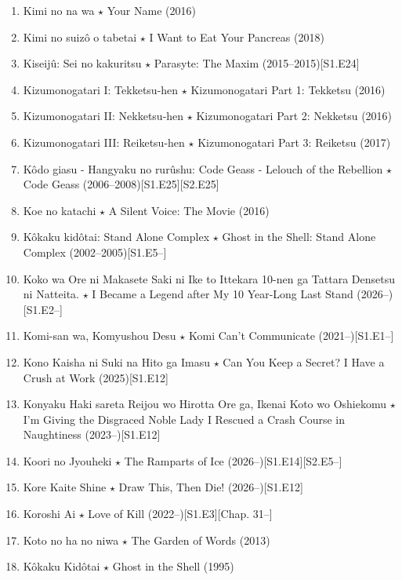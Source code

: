 \documentclass{article}
\begin{document}
\begin{enumerate}
    {\sf Comment.} WTF is this anime?
    \item {\sc Kimi no na wa $\star$ Your Name} (2016)
    \item {\sc Kimi no suiz\^o o tabetai $\star$ I Want to Eat Your Pancreas} (2018)
    \item {\sc Kiseij\^u: Sei no kakuritsu $\star$ Parasyte: The Maxim} (2015--2015)\hfill[S1.E24]
    \item {\sc Kizumonogatari I: Tekketsu-hen $\star$ Kizumonogatari Part 1: Tekketsu} (2016)
    \item {\sc Kizumonogatari II: Nekketsu-hen $\star$ Kizumonogatari Part 2: Nekketsu} (2016)
    \item {\sc Kizumonogatari III: Reiketsu-hen $\star$ Kizumonogatari Part 3: Reiketsu} (2017)
    \item {\sc Kôdo giasu - Hangyaku no rurûshu: Code Geass - Lelouch of the Rebellion $\star$ Code Geass} (2006--2008)\hfill[S1.E25][S2.E25]
    \item {\sc Koe no katachi $\star$ A Silent Voice: The Movie} (2016)
    \item Kôkaku kidôtai: Stand Alone Complex $\star$ Ghost in the Shell: Stand Alone Complex (2002--2005)\hfill[S1.E5--]
    \item Koko wa Ore ni Makasete Saki ni Ike to Ittekara 10-nen ga Tattara Densetsu ni Natteita. $\star$ I Became a Legend after My 10 Year-Long Last Stand (2026--)\hfill[S1.E2--]
    \item Komi-san wa, Komyushou Desu $\star$ Komi Can't Communicate (2021--)\hfill[S1.E1--]
    \item {\sc Kono Kaisha ni Suki na Hito ga Imasu $\star$ Can You Keep a Secret? I Have a Crush at Work} (2025)\hfill[S1.E12]
    \item {\sc Konyaku Haki sareta Reijou wo Hirotta Ore ga, Ikenai Koto wo Oshiekomu $\star$ I'm Giving the Disgraced Noble Lady I Rescued a Crash Course in Naughtiness} (2023--)\hfill[S1.E12]
    \item {\sc Koori no Jyouheki $\star$ The Ramparts of Ice} (2026--)\hfill[S1.E14][S2.E5--]
    \item {\sc Kore Kaite Shine $\star$ Draw This, Then Die!} (2026--)\hfill[S1.E12]
    \item Koroshi Ai $\star$ Love of Kill (2022--)\hfill[S1.E3][Chap. 31--]
    \item {\sc Koto no ha no niwa $\star$ The Garden of Words} (2013)
    \item {\sc K\^okaku Kid\^otai $\star$ Ghost in the Shell} (1995)

\end{enumerate}
\end{document}
